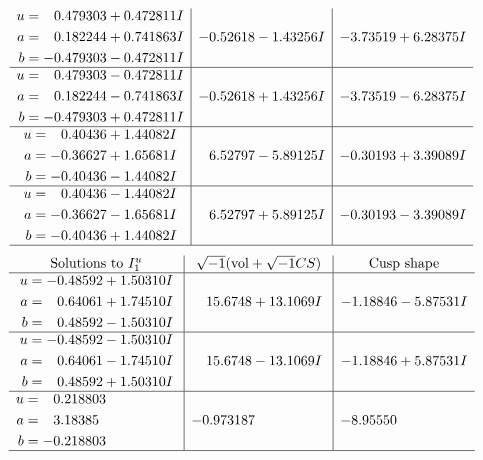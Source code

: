 \documentclass[1p]{elsarticle_modified}
\theoremstyle{definition}
\newcommand{\I}{\sqrt{-1}}
\begin{document}
$$\begin{array}{c|c|c}
\begin{aligned}
u &= \phantom{-}0.479303 + 0.472811 I \\
a &= \phantom{-}0.182244 + 0.741863 I \\
b &= -0.479303 - 0.472811 I\end{aligned}
 & -0.52618 - 1.43256 I & -3.73519 + 6.28375 I \\ \hline\begin{aligned}
u &= \phantom{-}0.479303 - 0.472811 I \\
a &= \phantom{-}0.182244 - 0.741863 I \\
b &= -0.479303 + 0.472811 I\end{aligned}
 & -0.52618 + 1.43256 I & -3.73519 - 6.28375 I \\ \hline\begin{aligned}
u &= \phantom{-}0.40436 + 1.44082 I \\
a &= -0.36627 + 1.65681 I \\
b &= -0.40436 - 1.44082 I\end{aligned}
 & \phantom{-}6.52797 - 5.89125 I & -0.30193 + 3.39089 I \\ \hline\begin{aligned}
u &= \phantom{-}0.40436 - 1.44082 I \\
a &= -0.36627 - 1.65681 I \\
b &= -0.40436 + 1.44082 I\end{aligned}
 & \phantom{-}6.52797 + 5.89125 I & -0.30193 - 3.39089 I\\
 \hline 
 \end{array}$$\newpage$$\begin{array}{c|c|c}  
\text{Solutions to }I^u_{1}& \I (\text{vol} + \sqrt{-1}CS) & \text{Cusp shape}\\
 \hline 
\begin{aligned}
u &= -0.48592 + 1.50310 I \\
a &= \phantom{-}0.64061 + 1.74510 I \\
b &= \phantom{-}0.48592 - 1.50310 I\end{aligned}
 & \phantom{-}15.6748 + 13.1069 I & -1.18846 - 5.87531 I \\ \hline\begin{aligned}
u &= -0.48592 - 1.50310 I \\
a &= \phantom{-}0.64061 - 1.74510 I \\
b &= \phantom{-}0.48592 + 1.50310 I\end{aligned}
 & \phantom{-}15.6748 - 13.1069 I & -1.18846 + 5.87531 I \\ \hline\begin{aligned}
u &= \phantom{-}0.218803\phantom{ +0.000000I} \\
a &= \phantom{-}3.18385\phantom{ +0.000000I} \\
b &= -0.218803\phantom{ +0.000000I}\end{aligned}
 & -0.973187\phantom{ +0.000000I} & -8.95550\phantom{ +0.000000I}\\
 \hline 
 \end{array}$$\newpage\newpage\renewcommand{\arraystretch}{1}
\end{document}
